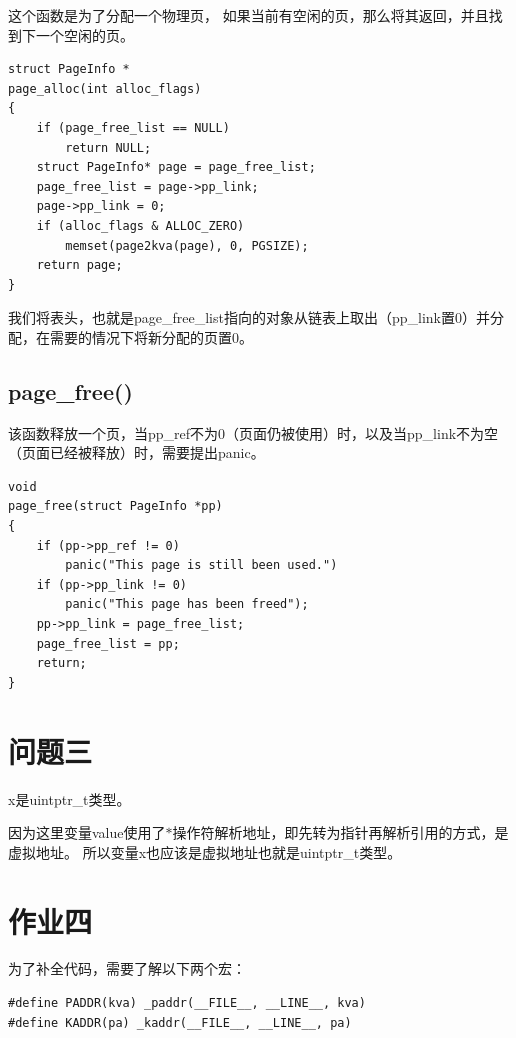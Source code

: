 \documentclass[12pt,a4paper,UTF8]{article}
\begin{document}
    这个函数是为了分配一个物理页，
    如果当前有空闲的页，那么将其返回，并且找到下一个空闲的页。

    \begin{lstlisting}[style=CPP]
struct PageInfo *
page_alloc(int alloc_flags)
{	
    if (page_free_list == NULL)
		return NULL;
	struct PageInfo* page = page_free_list;
	page_free_list = page->pp_link;
	page->pp_link = 0;
	if (alloc_flags & ALLOC_ZERO)
		memset(page2kva(page), 0, PGSIZE);
	return page;
}
    \end{lstlisting}

    我们将表头，也就是page\_free\_list指向的对象从链表上取出（pp\_link置0）并分配，在需要的情况下将新分配的页置0。

    \subsection{page\_free()}

    该函数释放一个页，当pp\_ref不为0（页面仍被使用）时，以及当pp\_link不为空（页面已经被释放）时，需要提出panic。

    \begin{lstlisting}[style=CPP]
void
page_free(struct PageInfo *pp)
{
    if (pp->pp_ref != 0)
        panic("This page is still been used.")
    if (pp->pp_link != 0) 
		panic("This page has been freed");
	pp->pp_link = page_free_list;
	page_free_list = pp;
	return; 
}
    \end{lstlisting}


\section{问题三}

x是uintptr\_t类型。

因为这里变量value使用了$*$操作符解析地址，即先转为指针再解析引用的方式，是虚拟地址。
所以变量x也应该是虚拟地址也就是uintptr\_t类型。

\section{作业四}
\setcounter{table}{0}
\setcounter{figure}{0}

    为了补全代码，需要了解以下两个宏：

    \begin{lstlisting}[style=CPP]
#define PADDR(kva) _paddr(__FILE__, __LINE__, kva)
#define KADDR(pa) _kaddr(__FILE__, __LINE__, pa)
    \end{lstlisting}
\end{document}
